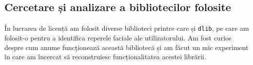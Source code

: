 \subsection{Cercetare și analizare a bibliotecilor folosite}
\paragraph{}
În lucrarea de licență am folosit diverse biblioteci printre care și \lstinline{dlib}, pe care am folosit-o pentru a identifica reperele faciale ale utilizatorului.
Am fost curios despre cum anume funcționează această bibliotecă și am făcut un mic experiment în care am încercat să reconstruiesc funcționalitatea acestei librării.